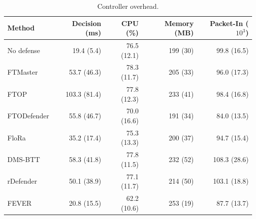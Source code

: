 \begin{table}[t]
\centering
\caption{Controller overhead.}
\label{tab:overhead}
\footnotesize
\setlength{\tabcolsep}{2pt}
\begin{tabular}{lrrrr}
\toprule
Method & Decision (ms) & CPU (\%) & Memory (MB) & Packet-In ($10^3$) \\
\midrule
No defense & 19.4 (5.4) & 76.5 (12.1) & 199 (30) & 99.8 (16.5) \\
FTMaster & 53.7 (46.3) & 78.3 (11.7) & 205 (33) & 96.0 (17.3) \\
FTOP & 103.3 (81.4) & 77.8 (12.3) & 233 (41) & 98.4 (16.8) \\
FTODefender & 55.8 (46.7) & 70.0 (16.6) & 191 (34) & 84.0 (13.5) \\
FloRa & 35.2 (17.4) & 75.3 (13.3) & 200 (37) & 94.7 (15.4) \\
DMS-BTT & 58.3 (41.8) & 77.8 (11.5) & 232 (52) & 108.3 (28.6) \\
rDefender & 50.1 (38.9) & 77.1 (11.7) & 214 (50) & 103.1 (18.8) \\
FEVER & 20.8 (15.5) & 62.2 (10.6) & 253 (19) & 87.7 (13.7) \\
\bottomrule
\end{tabular}
\end{table}
